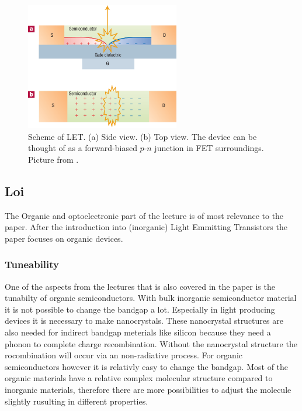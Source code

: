 \begin{figure}[!ht]
 \begin{center}
  \includegraphics[width=0.6\textwidth]{fig_B1}
  \caption{Scheme of LET. (a) Side view. (b) Top view. The device can be thought of as a forward-biased $p$-$n$ junction in FET surroundings. Picture from \citet{Muccini}.}
  \label{fig:LET}
 \end{center}
\end{figure}


\subsection{Loi}
The Organic and optoelectronic part of the lecture is of most relevance to the paper. After the introduction into (inorganic) Light Emmitting Transistors the paper focuses on organic devices.  \citep{loinotes}

\subsubsection{Tuneability}
One of the aspects from the lectures that is also covered in the paper is the tunabilty of organic semiconductors. With bulk inorganic semiconductor material it is not possible to change the bandgap a lot. Especially in light producing devices it is necessary to make nanocrystals. These nanocrystal structures are also needed for indirect bandgap meterials like silicon because they need a phonon to complete charge recombination. Without the nanocrystal structure the rocombination will occur via an non-radiative process. For organic semiconductors however it is relativly easy to change the bandgap. Most of the organic materials have a relative complex molecular structure compared to inorganic materials, therefore there are more possibilities to adjust the molecule slightly rusulting in different properties. 
